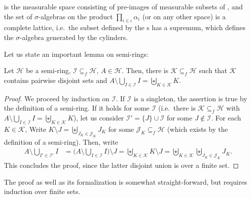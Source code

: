 \documentclass[lean]{AFM}
\begin{document}

is the measurable space consisting of pre-images of measurable subsets
of , and the set of $\sigma$-algebras on the product
$\prod_{i\in\iota} \alpha_i$ (or on any other space) is a complete
lattice, i.e.\ the subset defined by the s has a
supremum, which defines the $\sigma$-algebra generated by the
cylinders.

Let us state an important lemma on semi-rings:

\begin{lemma}\label{l1}
  Let $\mathcal H$ be a semi-ring, $\mathcal I \subseteq_f \mathcal H$,
  $A \in \mathcal H$. Then, there is $\mathcal K \subseteq_f \mathcal
  H$ such that $\mathcal K$ contains pairwise disjoint sets and $A
  \setminus \bigcup_{I \in \mathcal I} I = \biguplus_{K\in \mathcal K}
  K$.
\end{lemma}

\begin{proof}
  We proceed by induction on $\mathcal I$. If $\mathcal I$ is a
  singleton, the assertion is true by the definition of a semi-ring. If
  it holds for some $\mathcal I$ (i.e.\ there is $\mathcal K
  \subseteq_f \mathcal H$ with $A \setminus \bigcup_{I \in \mathcal I}
  I = \biguplus_{K\in \mathcal K} K$), let us consider $\mathcal I' =
  \{J\} \cup \mathcal I$ for some $J \notin \mathcal I$. For each $K
  \in \mathcal K$, Write $K \setminus J = \biguplus_{J_K \in \mathcal
    J_K} J_K$ for some $\mathcal J_K \subseteq_f \mathcal H$ (which
  exists by the definition of a semi-ring). Then, write
  \begin{align*}
    A \setminus \bigcup_{I' \in \mathcal I'} I & = \Big(A \setminus
    \bigcup_{I \in \mathcal I} I\Big) \setminus J = \biguplus_{K\in
      \mathcal K} K \setminus J = \biguplus_{K\in \mathcal K}
    \biguplus_{J_K \in \mathcal J_K} J_K.
  \end{align*}
  This concludes the proof, since the latter disjoint union is over a
  finite set.
\end{proof}

The proof as well as its formalization is somewhat straight-forward,
but requires induction over finite sets.

\end{document}
